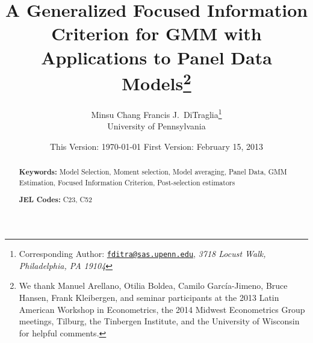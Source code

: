 \documentclass[12pt]{article}
\begin{document}
\title{A Generalized Focused Information Criterion for GMM with Applications to Panel Data Models\footnote{We thank Manuel Arellano, Otilia Boldea, Camilo Garc\'{i}a-Jimeno, Bruce Hansen, Frank Kleibergen, and seminar participants at the 2013 Latin American Workshop in Econometrics, the 2014 Midwest Econometrics Group meetings, Tilburg, the Tinbergen Institute, and the University of Wisconsin for helpful comments.}} 

\author{Minsu Chang \hspace{1em} Francis J.\ DiTraglia\footnote{Corresponding Author:
\href{mailto:fditra@sas.upenn.edu}{\texttt{fditra@sas.upenn.edu}}, \emph{3718 Locust Walk, Philadelphia, PA 19104}}
\\ University of Pennsylvania}

\date{\footnotesize This Version: \today \hspace{0.5em} First Version: February 15, 2013}

\maketitle 
\begin{abstract}
  \singlespacing
	

	\bigskip
	\noindent\textbf{Keywords:} 
  Model Selection, Moment selection, Model averaging, Panel Data, GMM Estimation, Focused Information Criterion, Post-selection estimators

	\medskip
	\noindent\textbf{JEL Codes:} C23, C52 
\end{abstract}










%



\singlespacing
\small



\appendix


\newpage

\end{document}
